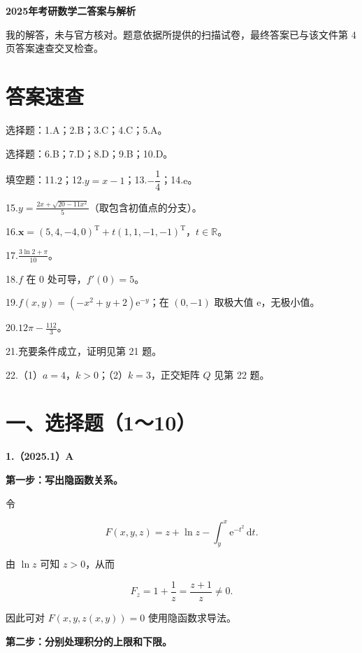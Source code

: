 \documentclass[UTF8,11pt,fontset=windows]{ctexart}
\begin{document}
{\LARGE\bfseries 2025年考研数学二答案与解析\par}\vspace{6pt}

\begingroup\color{gray}我的解答，未与官方核对。题意依据所提供的扫描试卷，最终答案已与该文件第 4 页答案速查交叉检查。\par\endgroup

\section*{答案速查}

选择题：1.A；2.B；3.C；4.C；5.A。

选择题：6.B；7.D；8.D；9.B；10.D。

填空题：11.$2$；12.$y=x-1$；13.$-\dfrac14$；14.$\mathrm e$。

15.$\displaystyle y=\frac{2x+\sqrt{20-11x^2}}5$（取包含初值点的分支）。

16.$\displaystyle \boldsymbol x=(5,4,-4,0)^{\mathrm T}+t(1,1,-1,-1)^{\mathrm T}$，$t\in\mathbb R$。

17.$\displaystyle \frac{3\ln2+\pi}{10}$。

18.$f$ 在 $0$ 处可导，$f'(0)=5$。

19.$\displaystyle f(x,y)=(-x^2+y+2)\mathrm e^{-y}$；在 $(0,-1)$ 取极大值 $\mathrm e$，无极小值。

20.$\displaystyle 12\pi-\frac{112}{3}$。

21.充要条件成立，证明见第 21 题。

22.（1）$a=4$，$k>0$；（2）$k=3$，正交矩阵 $Q$ 见第 22 题。

\clearpage

\section*{一、选择题（1～10）}

\textbf{1.（2025.1）A}

\textbf{第一步：写出隐函数关系。}

令

$$
F(x,y,z)=z+\ln z-\int_y^x\mathrm e^{-t^2}\,\mathrm dt.
$$

由 $\ln z$ 可知 $z>0$，从而

$$
F_z=1+\frac1z=\frac{z+1}{z}\ne0.
$$

因此可对 $F(x,y,z(x,y))=0$ 使用隐函数求导法。

\textbf{第二步：分别处理积分的上限和下限。}
\end{document}
